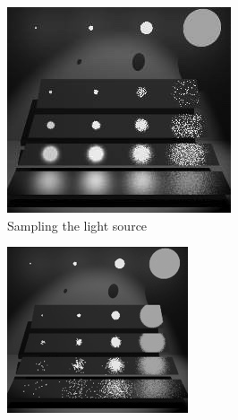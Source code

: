 \begin{figure}\label{f:mis}
	\begin{subfigure}[b]{0.328\textwidth}
		\includegraphics[width=1.\textwidth]{graphics/gi/mis-1}
		\caption{Sampling the light source}
	\end{subfigure}
	\begin{subfigure}[b]{0.328\textwidth}
		\includegraphics[width=1.\textwidth]{graphics/gi/mis-2}

\end{subfigure}
\end{figure}
